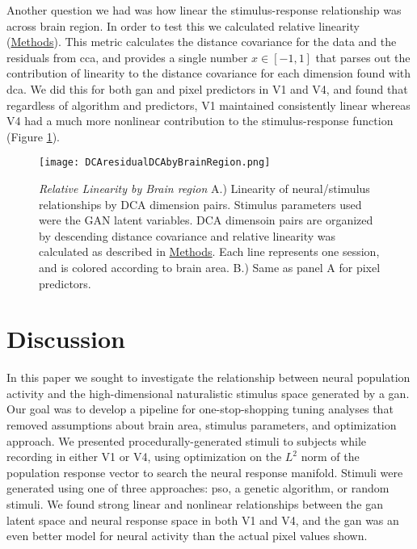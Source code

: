 Another question we had was how linear the stimulus-response relationship was across brain region. In order to test this we calculated relative linearity (\hyperref[{methods:relativeLinearity}]{Methods}). This metric calculates the distance covariance for the data and the residuals from \gls{cca}, and provides a single number $x \in [-1,1]$ that parses out the contribution of linearity to the distance covariance for each dimension found with \gls{dca}. We did this for both \gls{gan} and pixel predictors in V1 and V4, and found that regardless of algorithm and predictors, V1 maintained consistently linear whereas V4 had a much more nonlinear contribution to the stimulus-response function (Figure \ref{fig:dcaLinearity}).
	
\begin{figure}
	\centering
	\texttt{[image: DCAresidualDCAbyBrainRegion.png]}
	{\caption{{\it Relative Linearity by Brain region} A.) Linearity of neural/stimulus relationships by DCA dimension pairs. Stimulus parameters used were the GAN latent variables. DCA dimensoin pairs are organized by descending distance covariance and relative linearity was calculated as described in \hyperref[{methods:relativeLinearity}]{Methods}. Each line represents one session, and is colored according to brain area. B.) Same as panel A for pixel predictors.}
	\label{fig:dcaLinearity}}
\end{figure}


\section{Discussion}
\glsresetall
In this paper we sought to investigate the relationship between neural population activity and the high-dimensional naturalistic stimulus space generated by a \gls{gan}. Our goal was to develop a pipeline for one-stop-shopping tuning analyses that removed assumptions about brain area, stimulus parameters, and optimization approach. We presented procedurally-generated stimuli to subjects while recording in either V1 or V4, using optimization on the $L^2$ norm of the population response vector to search the neural response manifold. Stimuli were generated using one of three approaches: \gls{pso}, a genetic algorithm, or random stimuli. We found strong linear and nonlinear relationships between the \gls{gan} latent space and neural response space in both V1 and V4, and the \gls{gan} was an even better model for neural activity than the actual pixel values shown.

